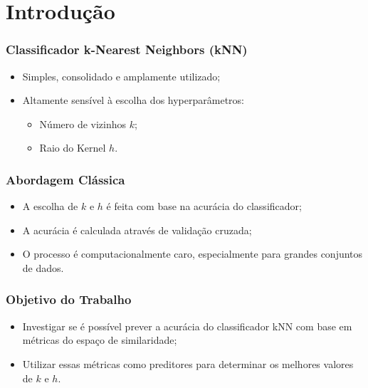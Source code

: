 \section{Introdução}

\begin{frame}

    \frametitle{Classificador k-Nearest Neighbors (kNN)}

    \begin{itemize}
    
        \item Simples, consolidado e amplamente utilizado;
        \item Altamente sensível à escolha dos hyperparâmetros:
        \begin{itemize}
            \item Número de vizinhos $k$;
            \item Raio do Kernel $h$.
        \end{itemize}

    \end{itemize}

\end{frame}


\begin{frame}

    \frametitle{Abordagem Clássica}

    \begin{itemize}
    
        \item A escolha de $k$ e $h$ é feita com base na acurácia do classificador;
        \item A acurácia é calculada através de validação cruzada;
        \item O processo é computacionalmente caro, especialmente para grandes conjuntos de dados.
    
    \end{itemize}

\end{frame}

\begin{frame}

    \frametitle{Objetivo do Trabalho}

    \begin{itemize}
    
        \item Investigar se é possível prever a acurácia do classificador kNN com base em métricas do espaço de similaridade;
        \item Utilizar essas métricas como preditores para determinar os melhores valores de $k$ e $h$.
    
    \end{itemize}

\end{frame}


